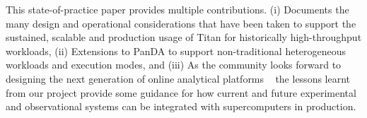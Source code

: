 This state-of-practice paper provides multiple contributions.  (i) Documents
the many design and operational considerations that have been  taken to
support the sustained, scalable and production usage of Titan for historically
high-throughput workloads, (ii) Extensions to PanDA to support non-traditional
heterogeneous workloads and execution modes,  and (iii) As the community looks
forward to designing the next generation of online analytical platforms
~\cite{foap} the lessons learnt from our project provide some guidance for how
current and future experimental and observational systems can be integrated
with supercomputers in production.






